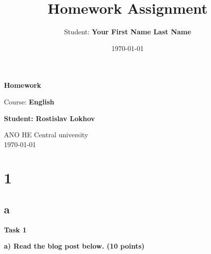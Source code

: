 \documentclass[a4paper,12pt]{article}
\title{Homework Assignment}
\author{Student: \textbf{Your First Name Last Name}}
\date{\today}
\begin{document}
\begin{titlepage}
    \centering
    \vspace*{1cm}

    \Huge
    \textbf{Homework}

    \vspace{0.5cm}
    \LARGE
    Course: \textbf{English}

    \vspace{1.5cm}

    \textbf{Student: Rostislav Lokhov}

    \vfill

    \Large
    ANO HE Central university\\
    \vspace{0.3cm}
    \today

\end{titlepage}

\tableofcontents
\newpage

\section{1}

\subsection{a}

\textbf{Task 1}

\textbf{a) Read the blog post below. (10 points)}
\end{document}
